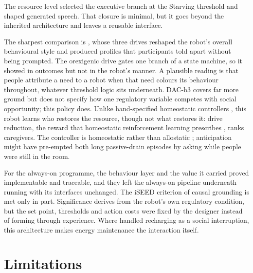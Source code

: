 The resource level selected the executive branch at the Starving threshold and shaped generated speech. That closure is minimal, but it goes beyond the inherited architecture and leaves a reusable interface.

The sharpest comparison is \citet{Berto2025CuriosityAffect}, whose three drives reshaped the robot's overall behavioural style and produced profiles that participants told apart without being prompted. The orexigenic drive gates one branch of a state machine, so it showed in outcomes but not in the robot's manner. A plausible reading is that people attribute a need to a robot when that need colours its behaviour throughout, whatever threshold logic sits underneath. DAC-h3 covers far more ground \citep{MoulinFrier2018DACH3} but does not specify how one regulatory variable competes with social opportunity; this policy does. Unlike hand-specified homeostatic controllers \citep{Cao2017CollaborativeHomeostatic}, this robot learns who restores the resource, though not what restores it: drive reduction, the reward that homeostatic reinforcement learning prescribes \citep{Yoshida2025HomeostasisRL}, ranks caregivers. The controller is homeostatic rather than allostatic \citep{Sterling2012Allostasis}; anticipation might have pre-empted both long passive-drain episodes by asking while people were still in the room.

For the always-on programme, the behaviour layer and the value it carried proved implementable and traceable, and they left the always-on pipeline underneath running with its interfaces unchanged. The iSEED criterion of causal grounding \citep{Pasquali2026ISEED} is met only in part. Significance derives from the robot's own regulatory condition, but the set point, thresholds and action costs were fixed by the designer instead of forming through experience. Where \citet{Deshmukh2018Recharging} handled recharging as a social interruption, this architecture makes energy maintenance the interaction itself.

\section{Limitations}
\label{sec:disc-identification}

